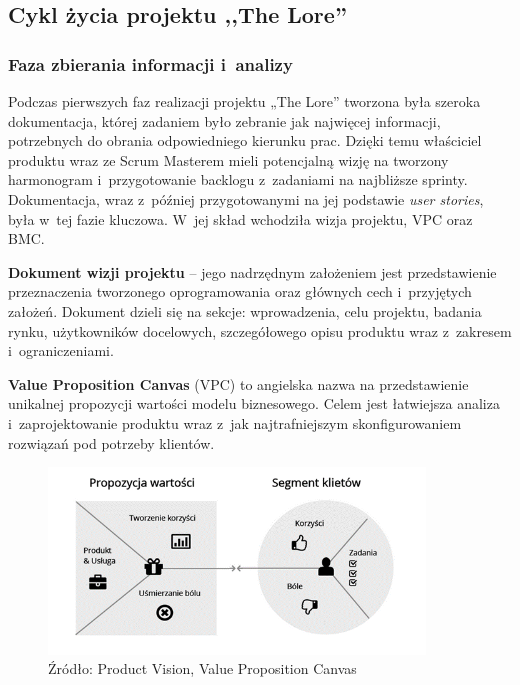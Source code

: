 \documentclass[oneside,polski,logo]{amuthesis}
\begin{document}
\subsection{Cykl życia projektu ,,The Lore''}

\subsubsection{Faza zbierania informacji i~analizy}

Podczas pierwszych faz realizacji projektu „The Lore” tworzona była szeroka dokumentacja, której zadaniem było zebranie jak najwięcej informacji, potrzebnych do obrania odpowiedniego kierunku prac. Dzięki temu właściciel produktu wraz ze Scrum Masterem mieli potencjalną wizję na tworzony harmonogram i~przygotowanie backlogu z~zadaniami na najbliższe sprinty. Dokumentacja, wraz z~później przygotowanymi na jej podstawie \emph{user stories}, była w~tej fazie kluczowa. W~jej skład wchodziła wizja projektu, VPC oraz BMC.

\textbf{Dokument wizji projektu} – jego nadrzędnym założeniem jest przedstawienie przeznaczenia tworzonego oprogramowania oraz głównych cech i~przyjętych założeń. Dokument dzieli się na sekcje: wprowadzenia, celu projektu, badania rynku, użytkowników docelowych, szczegółowego opisu produktu wraz z~zakresem i~ograniczeniami.

\textbf{Value Proposition Canvas} (VPC) to angielska nazwa na przedstawienie unikalnej propozycji wartości modelu biznesowego. Celem jest łatwiejsza analiza i~zaprojektowanie produktu wraz z~jak najtrafniejszym skonfigurowaniem rozwiązań pod potrzeby klientów. \cite{VPC}
\begin{figure}[h]
	\centering
	\includegraphics[width=10cm]{images/hyps/VPC.png}
	\caption{Źródło: Product Vision, Value Proposition Canvas}
\end{figure}
\end{document}
